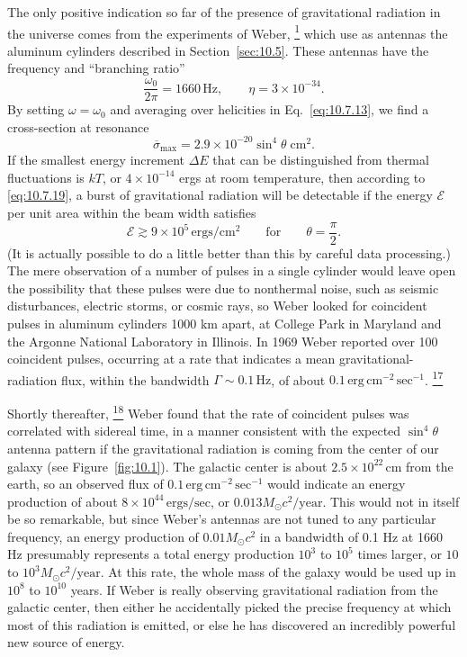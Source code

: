 The only positive indication so far of the presence of gravitational radiation
in the universe comes from the experiments of Weber,%
\hyperref[ch10-ref-1]{\textsuperscript{1}}
which use as antennas the aluminum cylinders described in
Section~\ref{sec:10.5}. These antennas have the frequency and ``branching
ratio''
\[
  \frac{\omega_0}{2\pi}=1660\,\mathrm{Hz},
  \qquad
  \eta=3\times10^{-34}.
\]
By setting \(\omega=\omega_0\) and averaging over helicities in
Eq.~\eqref{eq:10.7.13}, we find a cross-section at resonance
\[
  \overline{\sigma}_{\max}
  =
  2.9\times10^{-20}\sin^4\theta\;\mathrm{cm^2}.
\]
If the smallest energy increment \(\Delta E\) that can be distinguished from
thermal fluctuations is \(kT\), or \(4\times10^{-14}\) ergs at room
temperature, then according to \eqref{eq:10.7.19}, a burst of gravitational
radiation will be detectable if the energy \(\mathcal{E}\) per unit area
within the beam width satisfies
\[
  \mathcal{E}\gtrsim9\times10^5\,\mathrm{ergs/cm^2}
  \qquad\text{for}\qquad
  \theta=\frac{\pi}{2}.
\]
(It is actually possible to do a little better than this by careful data
processing.) The mere observation of a number of pulses in a single cylinder
would leave open the possibility that these pulses were due to nonthermal
noise, such as seismic disturbances, electric storms, or cosmic rays, so Weber
looked for coincident pulses in aluminum cylinders 1000 km apart, at College
Park in Maryland and the Argonne National Laboratory in Illinois. In 1969
Weber reported over 100 coincident pulses, occurring at a rate that indicates
a mean gravitational-radiation flux, within the bandwidth
\(\Gamma\sim0.1\,\mathrm{Hz}\), of about
\(0.1\,\mathrm{erg\,cm^{-2}\,sec^{-1}}\).%
\hyperref[ch10-ref-17]{\textsuperscript{17}}

Shortly thereafter,%
\hyperref[ch10-ref-18]{\textsuperscript{18}}
Weber found that the rate of coincident pulses was correlated with sidereal
time, in a manner consistent with the expected \(\sin^4\theta\) antenna
pattern if the gravitational radiation is coming from the center of our galaxy
(see Figure~\ref{fig:10.1}). The galactic center is about
\(2.5\times10^{22}\,\mathrm{cm}\) from the earth, so an observed flux of
\(0.1\,\mathrm{erg\,cm^{-2}\,sec^{-1}}\) would indicate an energy
production of about \(8\times10^{44}\,\mathrm{ergs/sec}\), or
\(0.013M_\odot c^2/\mathrm{year}\). This would not in itself be so
remarkable, but since Weber's antennas are not tuned to any particular
frequency, an energy production of \(0.01M_\odot c^2\) in a bandwidth of
0.1 Hz at 1660 Hz presumably represents a total energy production \(10^3\)
to \(10^5\) times larger, or \(10\) to \(10^3M_\odot c^2/\mathrm{year}\).
At this rate, the whole mass of the galaxy would be used up in \(10^8\) to
\(10^{10}\) years. If Weber is really observing gravitational radiation from
the galactic center, then either he accidentally picked the precise frequency
at which most of this radiation is emitted, or else he has discovered an
incredibly powerful new source of energy.

